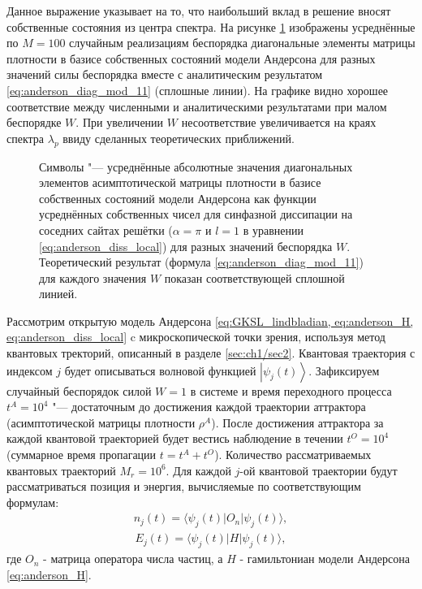 Данное выражение указывает на то, что наибольший вклад в решение вносят собственные состояния из центра спектра.
На рисунке \cref{fig:anderson_rho_nn_2} изображены усреднённые по \(M=100\) случайным реализациям беспорядка диагональные элементы матрицы плотности в базисе собственных состояний модели Андерсона для разных значений силы беспорядка вместе с аналитическим результатом \cref {eq:anderson_diag_mod_11} (сплошные линии). На графике видно хорошее соответствие между численными и аналитическими результатами при малом беспорядке \(W\). При увеличении \(W\) несоответствие увеличивается на краях спектра \(\lambda_p\) ввиду сделанных теоретических приближений. 
\begin{figure}[ht]
	\caption[Усреднённые диагональные элементы матрицы плотности c преобладанием делокализованных Андерсоновских мод и теоретической оценкой]{
		Символы "--- усреднённые абсолютные значения диагональных элементов асимптотической матрицы плотности в базисе собственных состояний модели Андерсона как функции усреднённых собственных чисел для синфазной диссипации на соседних сайтах решётки (\(\alpha=\pi\) и \(l=1\) в уравнении \cref{eq:anderson_diss_local}) для разных значений беспорядка \(W\). Теоретический результат (формула \cref{eq:anderson_diag_mod_11}) для каждого значения \(W\) показан соответствующей сплошной линией.
	}
	\label{fig:anderson_rho_nn_2}
\end{figure}

Рассмотрим открытую модель Андерсона \cref{eq:GKSL_lindbladian, eq:anderson_H, eq:anderson_diss_local} c микроскопической точки зрения, используя метод квантовых тректорий, описанный в разделе \cref{sec:ch1/sec2}. Квантовая траектория с индексом \(j\) будет описываться волновой функцией \(\left| \psi_j(t) \right\rangle\). Зафиксируем случайный беспорядок  силой \(W=1\) в системе и время переходного процесса \(t^A = 10^4\) "--- достаточным до достижения каждой траектории аттрактора (асимптотической матрицы плотности \(\rho^A\)). После достижения аттрактора за каждой квантовой траекторией будет вестись наблюдение в течении \(t^O = 10^4\) (суммарное время пропагации \(t = t^A + t^O\)). Количество рассматриваемых квантовых траекторий \(M_r=10^6\). Для каждой \(j\)-ой квантовой траектории будут рассматриваться позиция и энергия, вычисляемые по соответствующим формулам:
\begin{equation}
\label{eq:anderson_position}
\begin{gathered}
n_j(t) = \langle \psi_j(t)| O_n | \psi_j(t) \rangle,
\end{gathered}
\end{equation}
\begin{equation}
\label{eq:anderson_energy}
\begin{gathered}
E_j(t) = \langle \psi_j(t)| H | \psi_j(t) \rangle,
\end{gathered}
\end{equation}
где \(O_n\) - матрица оператора числа частиц, а \(H\) - гамильтониан модели Андерсона \cref{eq:anderson_H}.

